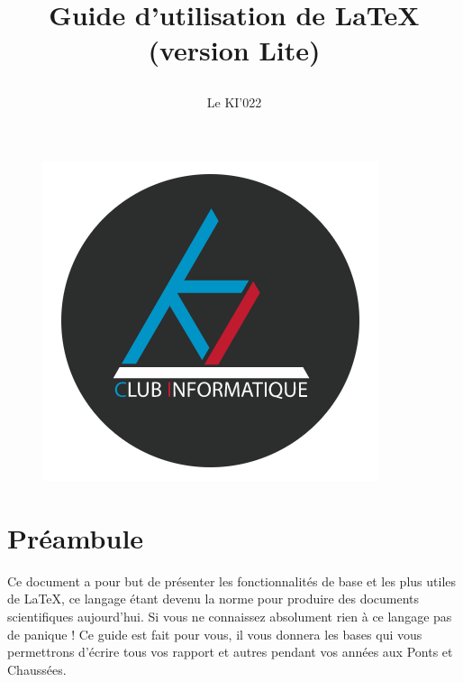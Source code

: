 \documentclass[11pt]{article}				%
\title{\textbf{Guide d'utilisation de \LaTeX} (version Lite)
\author{Le KI'022}
\date{}
}
\begin{document}
\maketitle

\begin{figure}[h]
\begin{center}
\includegraphics[scale=0.5]{ressources/KI.png}
\end{center}
\end{figure}

\section*{Préambule}

Ce document a pour but de présenter les fonctionnalités de base et les plus utiles de LaTeX, ce langage étant devenu la norme pour produire des documents scientifiques aujourd'hui. Si vous ne connaissez absolument rien à ce langage pas de panique ! Ce guide est fait pour vous, il vous donnera les bases qui vous permettrons d'écrire tous vos rapport et autres pendant vos années aux Ponts et Chaussées. \\
\end{document}
